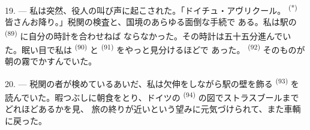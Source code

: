 19. --- 私は突然、役人の叫び声に起こされた。「ドイチュ・アヴリクール。
\textsuperscript{(*)} 皆さんお降り。」税関の検査と、国境のあらゆる面倒な手続で
ある。私は駅の \textsuperscript{(89)} に自分の時計を合わせねば
ならなかった。その時計は五十五分進んでいた。眠い目で私は
\textsuperscript{(90)} と \textsuperscript{(91)} をやっと見分けるほどで
あった。 \textsuperscript{(92)} そのものが朝の霧でかすんでいた。

20. --- 税関の者が検めているあいだ、私は欠伸をしながら駅の壁を飾る
 \textsuperscript{(93)} を読んでいた。暇つぶしに朝食をとり、ドイツの
 \textsuperscript{(94)} の図でストラスブールまでどれほどあるかを見、
旅の終りが近いという望みに元気づけられて、また車輌に戻った。
\VUsaut{6.0mm}
\VUfilet{22mm}

